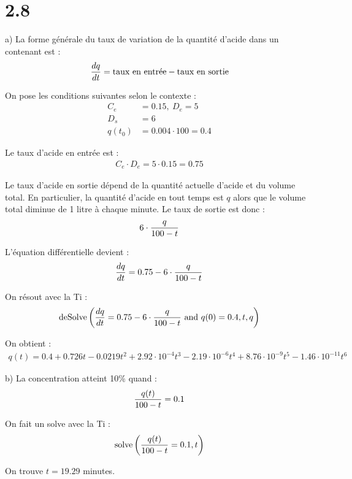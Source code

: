\section*{2.8}

a) La forme générale du taux de variation de la quantité d'acide dans un
contenant est :
\begin{align*}
    \dfrac{d q}{d t} = \text{taux en entrée}-\text{taux en sortie}
\end{align*}

On pose les conditions suivantes selon le contexte :
\begin{align*}
    C_e &= 0.15,\ D_e = 5 \\
    D_s &= 6 \\
    q(t_0) &= 0.004\cdot 100 = 0.4
\end{align*}

Le taux d'acide en entrée est :
\begin{align*}
    C_e\cdot D_e = 5\cdot0.15 = 0.75
\end{align*}

Le taux d'acide en sortie dépend de la quantité actuelle d'acide et du volume
total. En particulier, la quantité d'acide en tout temps est $q$ alors que le
volume total diminue de 1 litre à chaque minute. Le taux de sortie est donc :
\begin{align*}
    6\cdot\dfrac{q}{100-t}
\end{align*}

L'équation différentielle devient :
\begin{align*}
    \dfrac{d q}{d t} = 0.75 - 6\cdot\dfrac{q}{100-t}
\end{align*}

On résout avec la Ti :
\begin{align*}
    \operatorname{deSolve}\left({\dfrac{d q}{d t} = 0.75 - 6\cdot\dfrac{q}{100-t}\text{ and }
    q(0) = 0.4,t,q}\right)
\end{align*}

On obtient :
\begin{align*}
    q(t) = 0.4 + 0.726t - 0.0219t^2 + 2.92\cdot10^{-4}t^3
    -2.19\cdot10^{-6}t^4 + 8.76\cdot10^{-9}t^5
    -1.46\cdot10^{-11}t^6
\end{align*}

b) La concentration atteint 10\% quand :
\begin{align*}
    \dfrac{q(t)}{100-t} = 0.1
\end{align*}

On fait un solve avec la Ti :
\begin{align*}
    \operatorname{solve}\left({\dfrac{q(t)}{100-t} = 0.1,t}\right)
\end{align*}

On trouve $t=19.29$ minutes.
